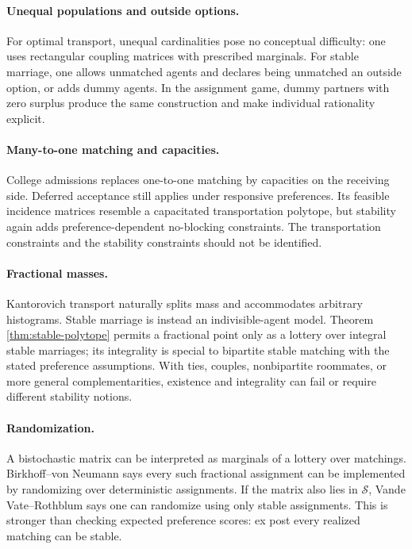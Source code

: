 \documentclass[11pt]{article}
\theoremstyle{definition}
\theoremstyle{remark}
\newcommand{\Scal}{\mathcal S}
\begin{document}
\paragraph{Unequal populations and outside options.}
For optimal transport, unequal cardinalities pose no conceptual difficulty:
one uses rectangular coupling matrices with prescribed marginals. For stable
marriage, one allows unmatched agents and declares being unmatched an outside
option, or adds dummy agents. In the assignment game, dummy partners with zero
surplus produce the same construction and make individual rationality explicit.

\paragraph{Many-to-one matching and capacities.}
College admissions replaces one-to-one matching by capacities on the receiving
side. Deferred acceptance still applies under responsive preferences. Its
feasible incidence matrices resemble a capacitated transportation polytope,
but stability again adds preference-dependent no-blocking constraints. The
transportation constraints and the stability constraints should not be
identified.

\paragraph{Fractional masses.}
Kantorovich transport naturally splits mass and accommodates arbitrary
histograms. Stable marriage is instead an indivisible-agent model. Theorem
\ref{thm:stable-polytope} permits a fractional point only as a lottery over
integral stable marriages; its integrality is special to bipartite stable
matching with the stated preference assumptions. With ties, couples,
nonbipartite roommates, or more general complementarities, existence and
integrality can fail or require different stability notions.

\paragraph{Randomization.}
A bistochastic matrix can be interpreted as marginals of a lottery over
matchings. Birkhoff--von Neumann says every such fractional assignment can be
implemented by randomizing over deterministic assignments. If the matrix also
lies in \(\Scal\), Vande Vate--Rothblum says one can randomize using only stable
assignments. This is stronger than checking expected preference scores: ex
post every realized matching can be stable.
\end{document}
